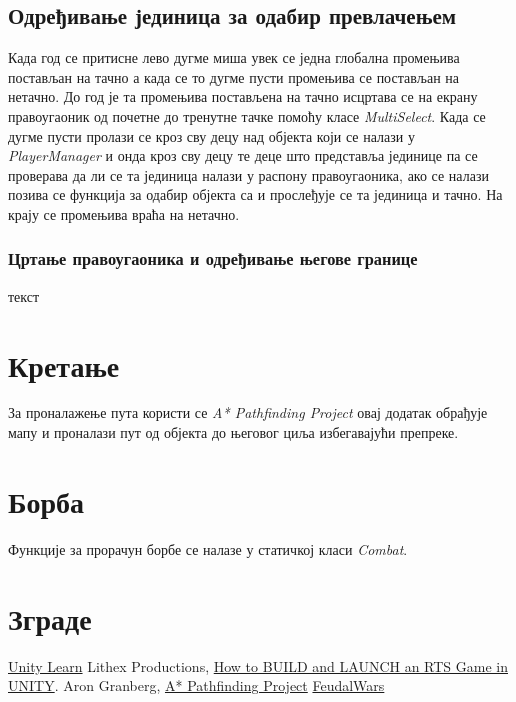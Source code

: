 \documentclass[11pt,a4paper]{report}
\begin{document}
\subsection{Одређивање јединица за одабир превлачењем}
Када год се притисне лево дугме миша увек се једна глобална промењива постављан на тачно а када се то дугме пусти промењива се постављан на нетачно. До год је та промењива постављена на тачно исцртава се на екрану правоугаоник од почетне до тренутне тачке помоћу класе \emph{MultiSelect}. Када се дугме пусти пролази се кроз сву децу над објекта који се налази у \emph{PlayerManager} и онда кроз сву децу те деце што представља јединице па се проверава да ли се та јединица налази у распону правоугаоника, ако се налази позива се функција за одабир објекта са и прослеђује се та јединица и тачно. На крају се промењива враћа на нетачно.

\subsubsection{Цртање правоугаоника и одређивање његове границе}
текст 

\section{Кретање}
За проналажење пута користи се \emph{A* Pathfinding Project} овај додатак обрађује мапу и проналази пут од објекта до његовог циља избегавајући препреке.

\section{Борба}
Функције за прорачун борбе се налазе у статичкој класи \emph{Combat}.

\section{Зграде}

\begin{thebibliography}{9}
\href{https://learn.unity.com/}{Unity Learn}
   Lithex Productions, \href{https://www.youtube.com/watch?v=oVM_ugro6Mw&list=PLQPhaRCbpx5U0kcamApy727XC0v1bF0PK&index=1}{How to BUILD and LAUNCH an RTS Game in UNITY}.
Aron Granberg, \href{https://arongranberg.com/astar/front}{A* Pathfinding Project}
\href{https://opengameart.org/users/feudalwars}{FeudalWars}
\end{thebibliography}
\end{document}

